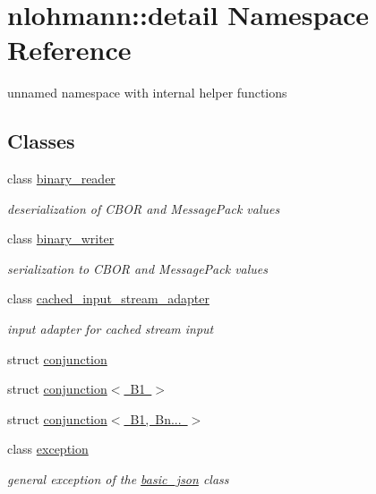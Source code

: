 \hypertarget{namespacenlohmann_1_1detail}{}\section{nlohmann\+:\+:detail Namespace Reference}
\label{namespacenlohmann_1_1detail}


unnamed namespace with internal helper functions  


\subsection*{Classes}
\begin{DoxyCompactItemize}
\item 
class \mbox{\hyperlink{classnlohmann_1_1detail_1_1binary__reader}{binary\+\_\+reader}}
\begin{DoxyCompactList}\small\item\em deserialization of C\+B\+OR and Message\+Pack values \end{DoxyCompactList}\item 
class \mbox{\hyperlink{classnlohmann_1_1detail_1_1binary__writer}{binary\+\_\+writer}}
\begin{DoxyCompactList}\small\item\em serialization to C\+B\+OR and Message\+Pack values \end{DoxyCompactList}\item 
class \mbox{\hyperlink{classnlohmann_1_1detail_1_1cached__input__stream__adapter}{cached\+\_\+input\+\_\+stream\+\_\+adapter}}
\begin{DoxyCompactList}\small\item\em input adapter for cached stream input \end{DoxyCompactList}\item 
struct \mbox{\hyperlink{structnlohmann_1_1detail_1_1conjunction}{conjunction}}
\item 
struct \mbox{\hyperlink{structnlohmann_1_1detail_1_1conjunction_3_01_b1_01_4}{conjunction$<$ B1 $>$}}
\item 
struct \mbox{\hyperlink{structnlohmann_1_1detail_1_1conjunction_3_01_b1_00_01_bn_8_8_8_01_4}{conjunction$<$ B1, Bn... $>$}}
\item 
class \mbox{\hyperlink{classnlohmann_1_1detail_1_1exception}{exception}}
\begin{DoxyCompactList}\small\item\em general exception of the \mbox{\hyperlink{classnlohmann_1_1basic__json}{basic\+\_\+json}} class \end{DoxyCompactList}\item 

\end{DoxyCompactItemize}
